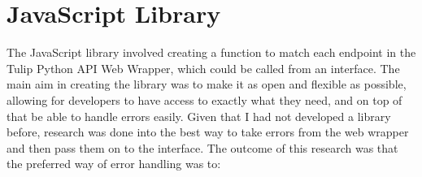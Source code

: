\documentclass[../dissertation.tex]{subfiles}
\begin{document}
\section{JavaScript Library}
\label{sec:jslib}

The JavaScript library involved creating a function to match each endpoint in the Tulip Python API Web Wrapper, which could be called from an interface. The main aim in creating the library was to make it as open and flexible as possible, allowing for developers to have access to exactly what they need, and on top of that be able to handle errors easily. Given that I had not developed a library before, research was done into the best way to take errors from the web wrapper and then pass them on to the interface. The outcome of this research was that the preferred way of error handling was to:
\end{document}

